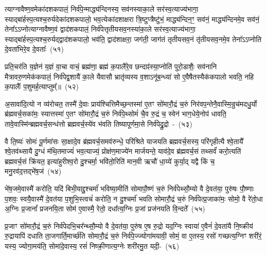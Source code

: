त्याग्नावैष्ण॒वमेका॑\-दश\-कपालं॒ निर्व॑पे॒न्माद्ध्य॑न्दिनस्य॒ सव॑नस्या\-का॒ले सर॑स्व॒त्याज्य॑भागा॒ स्याद्बा॑र्\mbox{}हस्प॒त्यश्च॒रुर्यदेका॑\-दश\-कपालो॒ भव॒त्येका॑\-दशाक्षरा त्रि॒ष्टुप्त्रैष्टु॑भं॒ माद्ध्य॑न्दिन॒ꣳ॒ सव॑नं॒ माद्ध्य॑न्दिनमे॒व सव॑नं॒ तेना᳚\-ऽऽ\-प्नोत्याग्नावैष्ण॒वं द्वाद॑श\-कपालं॒ निर्व॑पेत्तृतीय\-सव॒नस्या॑\-का॒ले सर॑स्व॒त्याज्य॑भागा॒ स्याद्बा॑र्\mbox{}ह\-स्प॒त्यश्च॒रुर्यद्द्वाद॑श\-कपालो॒ भव॑ति॒ द्वाद॑शाक्षरा॒ जग॑ती॒ जाग॑तं तृतीय\-सव॒नं तृ॑तीय\-सव॒नमे॒व तेना᳚\-ऽऽ\-प्नोति दे॒वता॑भिरे॒व दे॒वताः᳚~(५१)\ip

प्रति॒चर॑ति य॒ज्ञेन॑ य॒ज्ञं वा॒चा वाचं॒ ब्रह्म॑णा॒ ब्रह्म॑ क॒पालै॑रे॒व छन्दाꣴ॑स्या॒प्नोति॑ पुरो॒डाशैः॒ सव॑नानि मैत्रावरु॒णमेक॑कपालं॒ निर्व॑पेद्व॒शायै॑ का॒ले यैवासौ भ्रातृ॑व्यस्य व॒शा\-ऽनू॑ब॒न्ध्या॑ सो ए॒वैषैतस्यैक॑कपालो भवति॒ नहि क॒पालैः᳚ प॒शुमर्\mbox{}ह॒त्याप्तुम्᳚॥~(५२)\ip

{\anuvakamend[{ब्रह्म॑णै॒वैन॑म॒भिच॑रति य॒ज्ञो न तावे॒वास्ये᳚न्द्रि॒यमा᳚प्नोति दे॒वताः᳚ स॒प्तत्रिꣳ॑शच्च।}]}

अ॒सावा॑दि॒त्यो न व्य॑रोचत॒ तस्मै॑ दे॒वाः प्राय॑श्चित्ति\-मैच्छ॒न्तस्मा॑ ए॒तꣳ सो॑मारौ॒द्रं च॒रुं निर॑वप॒न्तेनै॒वास्मि॒न्रुच॑मद\-धु॒र्यो ब्र॑ह्मवर्च॒सका॑मः॒ स्यात्तस्मा॑ ए॒तꣳ सो॑मारौ॒द्रं च॒रुं निर्व॑पे॒थ्सोमं॑ चै॒व रु॒द्रं च॒ स्वेन॑ भाग॒\-धेये॒नोप॑ धावति॒ तावे॒वास्मि॑न्ब्रह्मवर्च॒सन्ध॑त्तो ब्रह्मवर्च॒स्ये॑व भ॑वति तिष्यापूर्णमा॒से निर्व॑पेद्रु॒द्रो~-~(५३)\ip

वै ति॒ष्यः॑ सोमः॑ पू॒र्णमा॑सः सा॒क्षादे॒व ब्र॑ह्मवर्च॒समव॑\-रुन्धे॒ परि॑श्रिते याजयति ब्रह्मवर्च॒सस्य॒ परि॑गृहीत्यै श्वे॒तायै᳚ श्वे॒तव॑थ्सायै दु॒ग्धं म॑थि॒तमाज्यं॑ भव॒त्याज्यं॒ प्रोक्ष॑ण॒माज्ये॑न मार्जयन्ते॒ याव॑दे॒व ब्र॑ह्मवर्च॒सं तथ्सर्वं॑ करो॒त्यति॑ ब्रह्मवर्च॒सं क्रि॑यत॒ इत्या॑हुरीश्व॒रो दु॒श्चर्मा॒ भवि॑तो॒रिति॑ मान॒वी ऋचौ॑ धा॒य्ये॑ कुर्या॒द् यद्वै किं च॒ मनु॒रव॑द॒त्तद्भे॑ष॒जं~(५४)\ip

भे॑ष॒जमे॒वास्मै॑ करोति॒ यदि॑ बिभी॒याद्दु॒श्चर्मा॑ भविष्या॒मीति॑ सोमापौ॒ष्णं च॒रुं निर्व॑पेथ्सौ॒म्यो वै दे॒वत॑या॒ पुरु॑षः पौ॒ष्णाः प॒शवः॒ स्वयै॒वास्मै॑ दे॒वत॑या प॒शुभि॒स्त्वचं॑ करोति॒ न दु॒श्चर्मा॑ भवति सोमारौ॒द्रं च॒रुं निर्व॑पेत्प्र॒जाका॑मः॒ सोमो॒ वै रे॑तो॒धा अ॒ग्निः प्र॒जानां᳚ प्रजनयि॒ता सोम॑ ए॒वास्मै॒ रेतो॒ दधा᳚त्य॒ग्निः प्र॒जां प्रज॑नयति वि॒न्दते᳚~(५५)\ip

प्र॒जाꣳ सो॑मारौ॒द्रं च॒रुं निर्व॑पेदभि॒चर᳚न्थ्सौ॒म्यो वै दे॒वत॑या॒ पुरु॑ष ए॒ष रु॒द्रो यद॒ग्निः स्वाया॑ ए॒वैनं॑ दे॒वता॑यै नि॒ष्क्रीय॑ रु॒द्रायापि॑ दधाति ता॒जगार्ति॒मार्च्छ॑ति सोमारौ॒द्रं च॒रुं निर्व॑पे॒ज्ज्योगा॑मयावी॒ सोमं॒ वा ए॒तस्य॒ रसो॑ गच्छत्य॒ग्निꣳ शरी॑रं॒ यस्य॒ ज्योगा॒मय॑ति॒ सोमा॑दे॒वास्य॒ रसं॑ निष्क्री॒णात्य॒ग्नेः शरी॑रमु॒त यदी॒-~(५६)\ip


